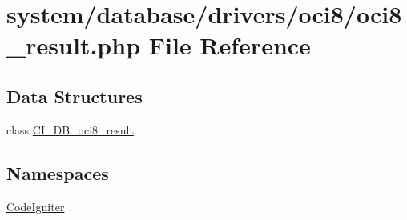\hypertarget{oci8__result_8php}{\section{system/database/drivers/oci8/oci8\-\_\-result.php File Reference}
\label{oci8__result_8php}
}
\subsection*{Data Structures}
\begin{DoxyCompactItemize}
\item 
class \hyperlink{class_c_i___d_b__oci8__result}{C\-I\-\_\-\-D\-B\-\_\-oci8\-\_\-result}
\end{DoxyCompactItemize}
\subsection*{Namespaces}
\begin{DoxyCompactItemize}
\item 
\hyperlink{namespace_code_igniter}{Code\-Igniter}
\end{DoxyCompactItemize}
